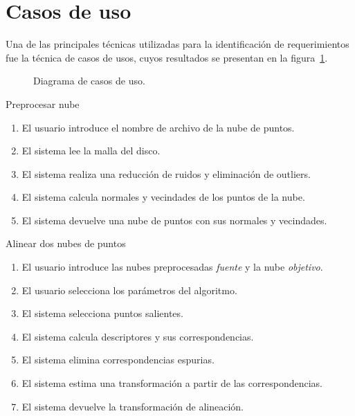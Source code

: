 \section{Casos de uso}
Una de las principales técnicas utilizadas para la identificación de requerimientos
fue la técnica de casos de usos, cuyos resultados se presentan en la figura~\ref{fig:casos_de_uso}.

\begin{figure}[h]
	\caption[Diagrama de casos de uso]{\label{fig:casos_de_uso}Diagrama de casos de uso.}
\end{figure}

\begin{CasoDeUso}{Preprocesar nube}
	\CUNormal
	\begin{enumerate}
		\item El usuario introduce el nombre de archivo de la nube de puntos.
		\item El sistema lee la malla del disco.
		\item El sistema realiza una reducción de ruidos y eliminación de outliers.
		\item El sistema calcula normales y vecindades de los puntos de la nube.
		\item El sistema devuelve una nube de puntos con sus normales y vecindades.
	\end{enumerate}
\end{CasoDeUso}

\begin{CasoDeUso}{Alinear dos nubes de puntos}
	\CUNormal
	\begin{enumerate}
		\item El usuario introduce las nubes preprocesadas \emph{fuente} y la nube \emph{objetivo}. 
		\item El usuario selecciona los parámetros del algoritmo.
		\item El sistema selecciona puntos salientes.
		\item El sistema calcula descriptores y sus correspondencias.
		\item El sistema elimina correspondencias espurias.
		\item El sistema estima una transformación a partir de las correspondencias.
		\item El sistema devuelve la transformación de alineación.
	\end{enumerate}
\end{CasoDeUso}

